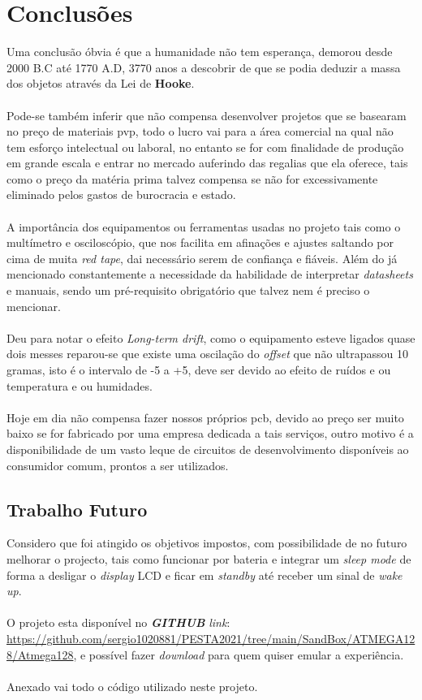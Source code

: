 \chapter{Conclusões}
\label{Chapter4}
Uma conclusão óbvia é que a humanidade não tem esperança, demorou desde 2000 B.C até 1770 A.D, 3770 anos a descobrir de que se podia deduzir a massa dos objetos através da Lei de \textbf{Hooke}.
\\
\\
Pode-se também inferir que não compensa desenvolver projetos que se basearam no preço de materiais \ac{pvp}, todo o lucro vai para a área comercial na qual não tem esforço intelectual ou laboral, no entanto se for com finalidade de produção em grande escala e entrar no mercado auferindo das regalias que ela oferece, tais como o preço da matéria prima talvez compensa se não for excessivamente eliminado pelos gastos de burocracia e estado.
\\
\\
A importância dos equipamentos ou ferramentas usadas no projeto tais como o multímetro e osciloscópio, que nos facilita em afinações e ajustes saltando por cima de muita \textit{red tape}, dai necessário serem de confiança e fiáveis. Além do já mencionado constantemente a necessidade da habilidade de interpretar \textit{datasheets} e manuais, sendo um pré-requisito obrigatório que talvez nem é preciso o mencionar.
\\
\\
Deu para notar o efeito \textit{Long-term drift}, como o equipamento esteve ligados quase dois messes reparou-se que existe uma oscilação do \textit{offset} que não ultrapassou 10 gramas, isto é o intervalo de -5 a +5, deve ser devido ao efeito de ruídos e ou temperatura e ou humidades.
\\
\\
Hoje em dia não compensa fazer nossos próprios \ac{pcb}, devido ao preço ser muito baixo se for fabricado por uma empresa dedicada a tais serviços, outro motivo é a disponibilidade  de um vasto leque de circuitos de desenvolvimento disponíveis ao consumidor comum, prontos a ser utilizados.
\section{Trabalho Futuro}
\label{sec:Ch6.1}
Considero que foi atingido os objetivos impostos, com possibilidade de no futuro melhorar o projecto, tais como funcionar por bateria e integrar um \textit{sleep mode} de forma a desligar o \textit{display} LCD e ficar em \textit{standby} até receber um sinal de \textit{wake up}.
\\
\\
O projeto esta disponível no \textit{\textbf{GITHUB}} \textit{link}: \url{https://github.com/sergio1020881/PESTA2021/tree/main/SandBox/ATMEGA128/Atmega128}, e possível fazer \textit{download} para quem quiser emular a experiência.
\\
\\
Anexado %
vai todo o código utilizado neste projeto.

